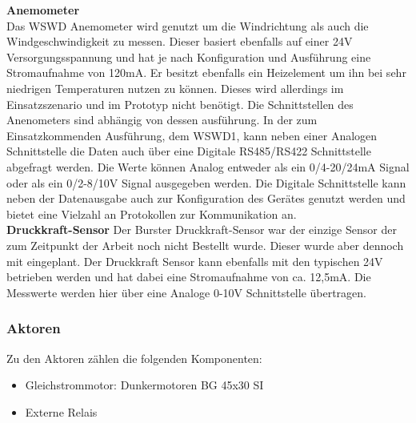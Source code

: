 \noindent\textbf{Anemometer}\\
Das WSWD Anemometer wird genutzt um die Windrichtung als auch die Windgeschwindigkeit zu messen. Dieser basiert ebenfalls auf einer 24V Versorgungsspannung und hat je nach Konfiguration und Ausführung eine Stromaufnahme von 120mA. Er besitzt ebenfalls ein Heizelement um ihn bei sehr niedrigen Temperaturen nutzen zu können. Dieses wird allerdings im Einsatzszenario und im Prototyp nicht benötigt. Die Schnittstellen des Anenometers sind abhängig von dessen ausführung. In der zum Einsatzkommenden Ausführung, dem WSWD1, kann neben einer Analogen Schnittstelle die Daten auch über eine Digitale RS485/RS422 Schnittstelle abgefragt werden. Die Werte können Analog entweder als ein 0/4-20/24mA Signal oder als ein 0/2-8/10V Signal ausgegeben werden. Die Digitale Schnittstelle kann neben der Datenausgabe auch zur Konfiguration des Gerätes genutzt werden und bietet eine Vielzahl an Protokollen zur Kommunikation an.\\

\noindent\textbf{Druckkraft-Sensor}\newline
Der Burster Druckkraft-Sensor war der einzige Sensor der zum Zeitpunkt der Arbeit noch nicht Bestellt wurde. Dieser wurde aber dennoch mit eingeplant. Der Druckkraft Sensor kann ebenfalls mit den typischen 24V betrieben werden und hat dabei eine Stromaufnahme von ca. 12,5mA. Die Messwerte werden hier über eine Analoge 0-10V Schnittstelle übertragen.\\
\subsubsection{Aktoren}
Zu den Aktoren zählen die folgenden Komponenten:
\begin{itemize}
	\item Gleichstrommotor: Dunkermotoren BG 45x30 SI
	\item Externe Relais
\end{itemize}

